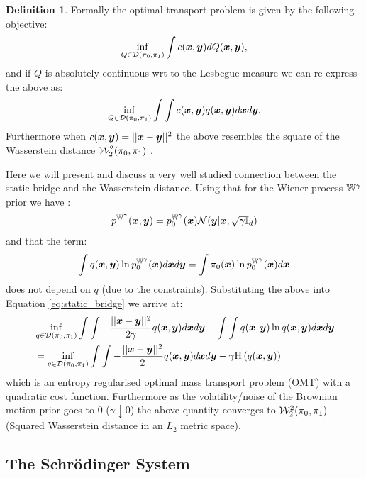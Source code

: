 \documentclass[a4paper,12pt,twoside,openright]{report}
\theoremstyle{definition}
\newtheorem{definition}{Definition}[section]
\begin{document}
\begin{definition}
Formally the optimal transport problem is given by the following objective:
\begin{align*}
\inf_{Q \in {\mathcal{D}}(\pi_0, \pi_1)}\int  c({\bm{x}}, {\bm{y}}) dQ({\bm{x}}, {\bm{y}}),
\end{align*}
and if $Q$ is absolutely continuous wrt to the Lesbegue measure we can re-express the above as:
\begin{align*}
\inf_{Q \in {\mathcal{D}}(\pi_0, \pi_1)}\int \int c({\bm{x}}, {\bm{y}}) q({\bm{x}}, {\bm{y}}) d{\bm{x}} d{\bm{y}}.
\end{align*}
Furthermore when $ c({\bm{x}}, {\bm{y}}) = || {\bm{x}} - {\bm{y}}||^2$  the above resembles the square of the Wasserstein distance ${\mathcal{W}}^2_{2}(\pi_0, \pi_1)$ .
\end{definition}

Here we will present and discuss a very well studied \citep{mikami2008optimal,leonard2012schrodinger,leonard2013survey,carlier2017convergence} connection between the static bridge and the Wasserstein distance.  Using that for the Wiener process $\mathbb{W}^\gamma$ prior we have :
\begin{align}
    p^{\mathbb{W}^{\gamma}}({\bm{x}},{\bm{y}}) = p^{\mathbb{W}^{\gamma}}_0({\bm{x}}){\mathcal{N}}({\bm{y}} | {\bm{x}}, \sqrt{\gamma}{\mathbb{I}_d})
\end{align}
and that the term:
\begin{align*}
    \int q({\bm{x}}, {\bm{y}})\ln  p^{\mathbb{W}^{\gamma}}_0({\bm{x}}) d{\bm{x}} d{\bm{y}} =  \int \pi_0({\bm{x}}) \ln  p^{\mathbb{W}^{\gamma}}_0({\bm{x}}) d{\bm{x}}  
\end{align*}
does not depend on $q$ (due to the constraints). Substituting the above into Equation \ref{eq:static_bridge} we arrive at:
\begin{align}
    &\inf _{q \in {\mathcal{D}}(\pi_0, \pi_1)}\int \int -\frac{||{\bm{x}} - {\bm{y}} ||^2}{2\gamma} q({\bm{x}}, {\bm{y}}) d{\bm{x}} d{\bm{y}}  + \int \int q({\bm{x}}, {\bm{y}}) \ln q({\bm{x}}, {\bm{y}}) d{\bm{x}} d{\bm{y}} \nonumber \\
    &=\inf _{q \in {\mathcal{D}}(\pi_0, \pi_1)}\int \int -\frac{||{\bm{x}} - {\bm{y}} ||^2}{2} q({\bm{x}}, {\bm{y}}) d{\bm{x}} d{\bm{y}}  - \gamma \text{H} \left(q({\bm{x}}, {\bm{y}})\right)
\end{align}
which is an entropy regularised optimal mass transport problem (OMT) \citep{villani2003topics} with a quadratic cost function. Furthermore as the volatility/noise of the Brownian motion prior goes to 0 ($\gamma \downarrow 0$) the above quantity converges to ${\mathcal{W}}^2_{2}(\pi_0, \pi_1)$ (Squared Wasserstein distance in an $L_2$ metric space).
\subsection{The Schrödinger System}
\end{document}
